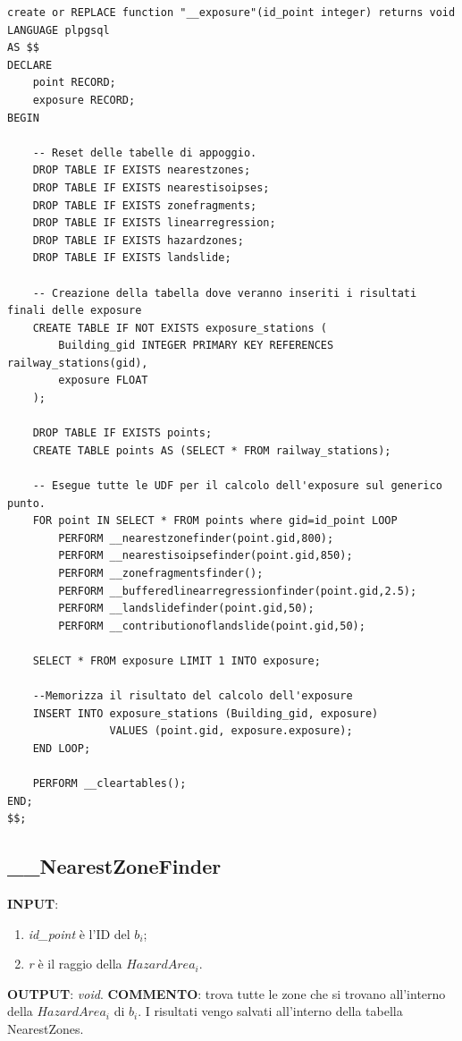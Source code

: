 \small
\begin{lstlisting}[style = mystyle]
create or REPLACE function "__exposure"(id_point integer) returns void
LANGUAGE plpgsql
AS $$
DECLARE
	point RECORD;
	exposure RECORD;
BEGIN
	
	-- Reset delle tabelle di appoggio.
	DROP TABLE IF EXISTS nearestzones;
	DROP TABLE IF EXISTS nearestisoipses;
	DROP TABLE IF EXISTS zonefragments;
	DROP TABLE IF EXISTS linearregression;
	DROP TABLE IF EXISTS hazardzones;
	DROP TABLE IF EXISTS landslide;
	
	-- Creazione della tabella dove veranno inseriti i risultati finali delle exposure
	CREATE TABLE IF NOT EXISTS exposure_stations (
		Building_gid INTEGER PRIMARY KEY REFERENCES railway_stations(gid),
		exposure FLOAT
	);

	DROP TABLE IF EXISTS points;
	CREATE TABLE points AS (SELECT * FROM railway_stations);

	-- Esegue tutte le UDF per il calcolo dell'exposure sul generico punto.
	FOR point IN SELECT * FROM points where gid=id_point LOOP
		PERFORM __nearestzonefinder(point.gid,800);
		PERFORM __nearestisoipsefinder(point.gid,850);
		PERFORM __zonefragmentsfinder();
		PERFORM __bufferedlinearregressionfinder(point.gid,2.5);
		PERFORM __landslidefinder(point.gid,50);
		PERFORM __contributionoflandslide(point.gid,50);

	SELECT * FROM exposure LIMIT 1 INTO exposure;
	
	--Memorizza il risultato del calcolo dell'exposure
	INSERT INTO exposure_stations (Building_gid, exposure) 
				VALUES (point.gid, exposure.exposure);
	END LOOP;

	PERFORM __cleartables();
END;
$$;
\end{lstlisting}

\newpage
\subsection{\_\_NearestZoneFinder}
\textbf{INPUT}: 
\begin{enumerate}
	\item \textit{id\_point} è l'ID del $b_i$;
	\item \textit{r} è il raggio della $HazardArea_i$.
\end{enumerate}
\textbf{OUTPUT}: \textit{void}. \newline
\textbf{COMMENTO}: trova tutte le zone che si trovano all'interno della $HazardArea_i$ di $b_i$. I risultati vengo salvati all'interno della tabella NearestZones.

